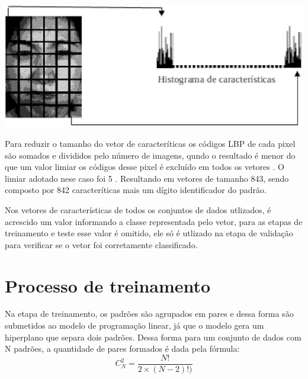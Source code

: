 \begin{itemize}
\begin{center}
	\includegraphics[scale=0.5]{graficos/histograma}
	\label{img:LBPHistograma}
\end{center}

Para reduzir o tamanho do vetor de caracteríticas os códigos LBP de cada pixel são somados e divididos pelo número de imagens, qundo o resultado é menor do que um valor limiar os códigos desse pixel é excluído em todos os vetores \cite{Feng}. O limiar adotado nese caso foi 5 \cite{LBPShan2009}. Resultando em vetores de tamanho 843, sendo composto por 842 caracteríticas mais um dígito identificador do padrão. 
\end{itemize}

Nos vetores de características de todos os conjuntos de dados utlizados, é acrescido um valor informando a classe representada pelo vetor, para as etapas de treinamento e teste esse valor é omitido, ele só é utlizado na etapa de validação para verificar se o vetor foi corretamente classificado.

\section{Processo de treinamento}
Na etapa de treinamento, os padrões são agrupados em pares e dessa forma são submetidos ao modelo de programação linear, já que o modelo gera um hiperplano que separa dois padrões. Dessa forma para um conjunto de dados com N padrões, a quantidade de pares formados é dada pela fórmula:
$$ C_{N}^{2}=\frac{N!}{2\times (N-2)!)} $$

